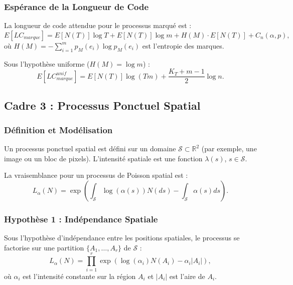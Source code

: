 \documentclass[11pt,a4paper]{article}
\begin{document}
	\subsubsection{Espérance de la Longueur de Code}
	
	La longueur de code attendue pour le processus marqué est :
	\begin{equation}
		E[LC_{marque}] = E[N(T)] \log T + E[N(T)] \log m + H(M) \cdot E[N(T)] + C_n(\alpha, p),
	\end{equation}
	où $H(M) = -\sum_{i=1}^m p_M(e_i) \log p_M(e_i)$ est l'entropie des marques.
	
	Sous l'hypothèse uniforme ($H(M) = \log m$) :
	\begin{equation}
		E[LC_{marque}^{unif}] = E[N(T)] \log(Tm) + \frac{K_T + m - 1}{2} \log n.
	\end{equation}
	
	\subsection{Cadre 3 : Processus Ponctuel Spatial}
	\label{subsec:cadre_spatial}
	
	\subsubsection{Définition et Modélisation}
	
	Un processus ponctuel spatial est défini sur un domaine $\mathcal{S} \subset \mathbb{R}^2$ (par exemple, une image ou un bloc de pixels). L'intensité spatiale est une fonction $\lambda(s)$, $s \in \mathcal{S}$.
	
	La vraisemblance pour un processus de Poisson spatial est :
	\begin{equation}
		L_{\alpha}(N) = \exp \left( \int_{\mathcal{S}} \log(\alpha(s)) N(ds) - \int_{\mathcal{S}} \alpha(s) ds \right).
	\end{equation}
	
	\subsubsection{Hypothèse 1 : Indépendance Spatiale}
	
	Sous l'hypothèse d'indépendance entre les positions spatiales, le processus se factorise sur une partition $\{A_1, \dots, A_r\}$ de $\mathcal{S}$ :
	\begin{equation}
		L_{\alpha}(N) = \prod_{i=1}^r \exp \left( \log(\alpha_i) N(A_i) - \alpha_i |A_i| \right),
	\end{equation}
	où $\alpha_i$ est l'intensité constante sur la région $A_i$ et $|A_i|$ est l'aire de $A_i$.
	
\end{document}

